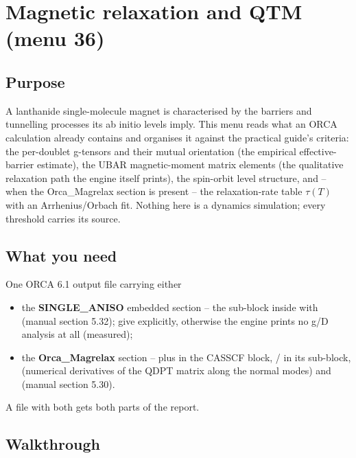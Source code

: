 \chapter{Magnetic relaxation and QTM (menu 36)}
\label{ch:menu36}

\section{Purpose}

A lanthanide single-molecule magnet is characterised by the barriers and
tunnelling processes its ab initio levels imply.  This menu reads what an
ORCA calculation already contains and organises it against the practical
guide's criteria: the per-doublet g-tensors and their mutual orientation
(the empirical effective-barrier estimate), the UBAR magnetic-moment matrix
elements (the qualitative relaxation path the engine itself prints), the
spin-orbit level structure, and -- when the Orca\_Magrelax section is
present -- the relaxation-rate table $\tau(T)$ with an Arrhenius/Orbach fit.
Nothing here is a dynamics simulation; every threshold carries its source.

\section{What you need}

One ORCA 6.1 output file carrying either

\begin{itemize}
  \item the \textbf{SINGLE\_ANISO} embedded section -- the 
    sub-block inside  with  (manual
    section 5.32); give  explicitly, otherwise the engine prints
    no g/D analysis at all (measured);
  \item the \textbf{Orca\_Magrelax} section --  plus
     in the CASSCF block, /
    in its  sub-block,  (numerical derivatives of
    the QDPT matrix along the normal modes) and  (manual
    section 5.30).
\end{itemize}

A file with both gets both parts of the report.

\section{Walkthrough}

